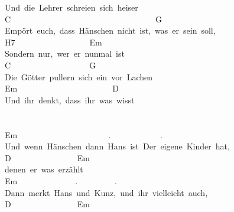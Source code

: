 \documentclass[]{book}
\begin{document}
Und~die~Lehrer~schreien~sich~heiser\\
C~~~~~~~~~~~~~~~~~~~~~~~~~~~~~~~~~~~G\\
Empört~euch,~dass~Hänschen~nicht~ist,~was~er~sein~soll,\\
\hspace*{0.333em}\hspace*{0.333em}\hspace*{0.333em}\hspace*{0.333em}\hspace*{0.333em}\hspace*{0.333em}\hspace*{0.333em}\hspace*{0.333em}H7~~~~~~~~~~~~~~~~~~Em~~\\
Sondern~nur,~wer~er~nunmal~ist\\
\hspace*{0.333em}\hspace*{0.333em}\hspace*{0.333em}\hspace*{0.333em}\hspace*{0.333em}C~~~~~~~~~~~~~~~~~~~G\\
Die~Götter~pullern~sich~ein~vor~Lachen\\
\hspace*{0.333em}\hspace*{0.333em}\hspace*{0.333em}\hspace*{0.333em}Em~~~~~~~~~~~~~~~~~~~~~~~D\\
Und~ihr~denkt,~dass~ihr~was~wisst\\
~\\
\hspace*{0.333em}\\
Em~~~~~~~~~~~~~~~~~~~~~~.~~~~~~~~~~~~.~~\\
Und~wenn~Hänschen~dann~Hans~ist~Der~eigene~Kinder~hat,~\\
D~~~~~~~~~~~~~~~~Em\\
denen~er~was~erzählt~\\
\hspace*{0.333em}\hspace*{0.333em}\hspace*{0.333em}\hspace*{0.333em}\hspace*{0.333em}Em~~~~~~~~~~~~~~.~~~~~~~~~.\\
Dann~merkt~Hans~und~Kunz,~und~ihr~vielleicht~auch,\\
\hspace*{0.333em}\hspace*{0.333em}\hspace*{0.333em}\hspace*{0.333em}\hspace*{0.333em}\hspace*{0.333em}D~~~~~~~~~~~~~~~~Em\\
\end{document}
